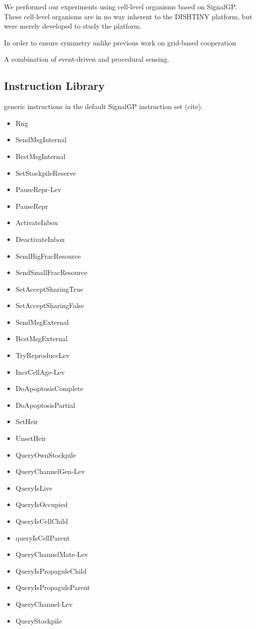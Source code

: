 We performed our experiments using cell-level organisms based on SignalGP.
These cell-level organisms are in no way inherent to the DISHTINY platform, but were merely developed to study the platform.

In order to ensure symmetry
unlike previous work on grid-based cooperation

A combination of event-driven and procedural sensing.

\subsection{Instruction Library}

generic instructions in the default SignalGP instruction set (cite).

\begin{itemize}
\item Rng
\item SendMsgInternal
\item BcstMsgInternal
\item SetStockpileReserve
\item PauseRepr-Lev
\item PauseRepr
\item ActivateInbox
\item DeactivateInbox
\item SendBigFracResource
\item SendSmallFracResource
\item SetAcceptSharingTrue
\item SetAcceptSharingFalse
\item SendMsgExternal
\item BcstMsgExternal
\item TryReproduceLev
\item IncrCellAge-Lev
\item DoApoptosisComplete
\item DoApoptosisPartial
\item SetHeir
\item UnsetHeir
\item QueryOwnStockpile
\item QueryChannelGen-Lev
\item QueryIsLive
\item QueryIsOccupied
\item QueryIsCellChild
\item queryIsCellParent
\item QueryChannelMate-Lev
\item QueryIsPropaguleChild
\item QueryIsPropaguleParent
\item QueryChannel-Lev
\item QueryStockpile
\end{itemize}


